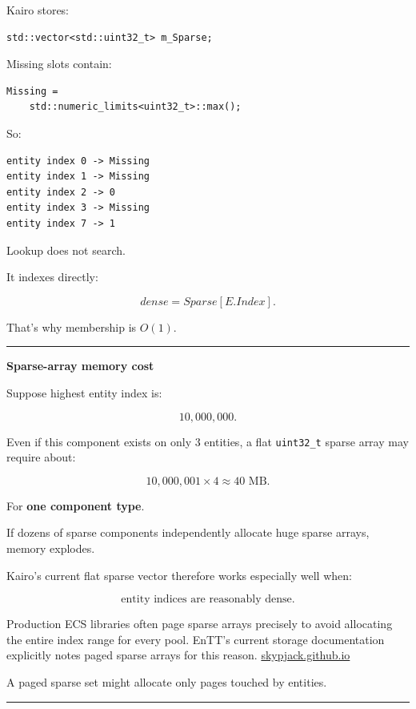 Kairo stores:

\begin{verbatim}
std::vector<std::uint32_t> m_Sparse;
\end{verbatim}

Missing slots contain:

\begin{verbatim}
Missing =
    std::numeric_limits<uint32_t>::max();
\end{verbatim}

So:

\begin{verbatim}
entity index 0 -> Missing
entity index 1 -> Missing
entity index 2 -> 0
entity index 3 -> Missing
entity index 7 -> 1
\end{verbatim}

Lookup does not search.

It indexes directly:

\[
dense=Sparse[E.Index].
\]

That's why membership is \(O(1)\).

\begin{center}\rule{0.5\linewidth}{0.5pt}\end{center}

\textbf{Sparse-array memory cost}

Suppose highest entity index is:

\[
10,000,000.
\]

Even if this component exists on only 3 entities, a flat \texttt{uint32\_t} sparse array may require about:

\[
10,000,001\times4
\approx40\text{ MB}.
\]

For \textbf{one component type}.

If dozens of sparse components independently allocate huge sparse arrays, memory explodes.

Kairo's current flat sparse vector therefore works especially well when:

\[
\text{entity indices are reasonably dense}.
\]

Production ECS libraries often page sparse arrays precisely to avoid allocating the entire index range for every pool. EnTT's current storage documentation explicitly notes paged sparse arrays for this reason. \href{https://skypjack.github.io/entt/md_docs_2md_2entity.html?utm_source=chatgpt.com}{skypjack.github.io}

A paged sparse set might allocate only pages touched by entities.

\begin{center}\rule{0.5\linewidth}{0.5pt}\end{center}

